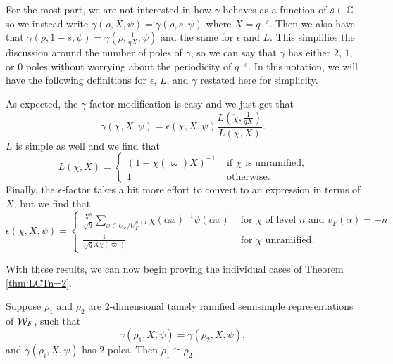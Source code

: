 For the most part, we are not interested in how $\gamma$ behaves as a function of $s \in \mathbb{C}$, so we instead write $\gamma(\rho, X, \psi) = \gamma(\rho,s,\psi)$ where $X = q^{-s}$.
Then we also have that $\gamma(\rho,1-s,\psi) = \gamma(\rho,\frac{1}{qX},\psi)$ and the same for $\epsilon$ and $L$.
This simplifies the discussion around the number of poles of $\gamma$, so we can say that $\gamma$ has either $2$, $1$, or $0$ poles without worrying about the periodicity of $q^{-s}$.
In this notation, we will have the following definitions for $\epsilon$, $L$, and $\gamma$ restated here for simplicity.

As expected, the $\gamma$-factor modification is easy and we just get that \[\gamma(\chi, X, \psi) = \epsilon(\chi, X, \psi) \frac{L(\check{\chi}, \frac{1}{qX})}{L(\chi, X)}.\]
$L$ is simple as well and we find that 
\[L(\chi, X) = \begin{cases} (1 - \chi(\varpi) X)^{-1} & \text{ if } \chi \text{ is unramified,} \\ 1 & \text{ otherwise.} \end{cases}\]
Finally, the $\epsilon$-factor takes a bit more effort to convert to an expression in terms of $X$, but we find that
\[\displaystyle\epsilon(\chi, X, \psi) = \begin{cases} \frac{X^n}{\sqrt{q}} \sum_{x \in U_F/U_F^{n+1}} \chi(\alpha x)^{-1} \psi(\alpha x) & \text{ for } \chi \text{ of level } n \text{ and } v_F(\alpha) = -n \\ \frac{1}{\sqrt{q}X\chi(\varpi)} & \text{ for } \chi \text{ unramified.}\end{cases}\]



With these results, we can now begin proving the individual cases of Theorem \ref{thm:LCTn=2}.

\begin{lemma}
  \label{lem:gamma-two-poles}
  Suppose $\rho_1$ and $\rho_2$ are $2$-dimensional tamely ramified semisimple representations of $\mathcal{W}_F$, such that
  \[\gamma(\rho_1,X,\psi) = \gamma(\rho_2,X,\psi),\]
  and $\gamma(\rho_i,X,\psi)$ has $2$ poles.
  Then $\rho_1 \cong \rho_2$.
\end{lemma}

